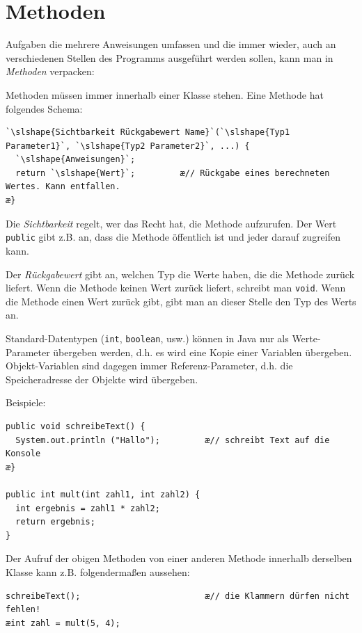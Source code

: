 \section{Methoden}

Aufgaben die mehrere Anweisungen umfassen und die immer wieder, auch an
verschiedenen Stellen des Programms ausgeführt werden sollen, kann man in
\emph{Methoden} \glqq verpacken\grqq :

Methoden müssen immer innerhalb einer Klasse stehen. Eine Methode hat
folgendes Schema:

\begin{lstlisting}
`\slshape{Sichtbarkeit Rückgabewert Name}`(`\slshape{Typ1 Parameter1}`, `\slshape{Typ2 Parameter2}`, ...) { 
  `\slshape{Anweisungen}`; 
  return `\slshape{Wert}`;         æ// Rückgabe eines berechneten Wertes. Kann entfallen.
æ}
\end{lstlisting}

Die \emph{Sichtbarkeit} regelt, wer das Recht hat, die Methode aufzurufen. Der
Wert \lstinline|public| gibt z.B. an, dass die Methode öffentlich ist und jeder
darauf zugreifen kann.

Der \emph{Rückgabewert} gibt an, welchen Typ die Werte haben, die die Methode
zurück liefert. Wenn die Methode keinen Wert zurück liefert, schreibt man
\lstinline|void|. Wenn die Methode einen Wert zurück gibt, gibt man an dieser
Stelle den Typ des Werts an.

Standard-Datentypen (\lstinline|int|, \lstinline|boolean|, usw.) können in Java
nur als Werte-Parameter übergeben werden, d.h.
es wird eine Kopie einer Variablen übergeben. Objekt-Variablen sind dagegen
immer Referenz-Parameter, d.h. die Speicheradresse der Objekte wird übergeben.

Beispiele:

\begin{lstlisting}
public void schreibeText() {
  System.out.println ("Hallo");         æ// schreibt Text auf die Konsole
æ}

public int mult(int zahl1, int zahl2) {
  int ergebnis = zahl1 * zahl2;
  return ergebnis;
}
\end{lstlisting}

Der Aufruf der obigen Methoden von einer anderen Methode innerhalb derselben Klasse kann z.B.
folgendermaßen aussehen:

\begin{lstlisting}
schreibeText();                         æ// die Klammern dürfen nicht fehlen!
æint zahl = mult(5, 4);
\end{lstlisting}